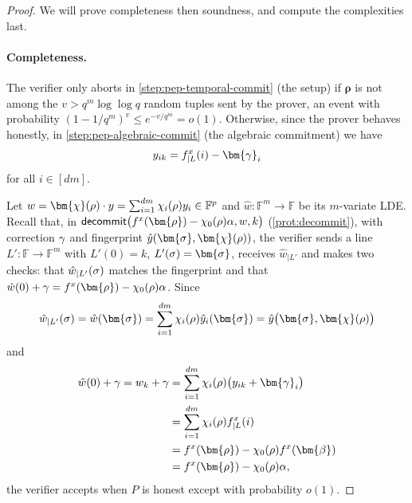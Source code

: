 \documentclass[a4paper,UKenglish,cleveref, autoref, thm-restate]{lipics-v2021}
\theoremstyle{definition}
\newcommand{\field}{\mathbb{F}}
\newcommand{\vcommitlength}{v}
\newcommand{\pcommitlength}{p}
\newcommand{\pcommitstring}{y}
\newcommand{\dimension}{m}
\newcommand{\degree}{d}
\newcommand{\fieldsize}{q}
\newcommand{\evaluationpoint}{\bm{\fe2}}
\newcommand{\fingerprinttuple}{\bm{\rho}}
\newcommand{\Fingerprinttuple}{\bm{\sigma}}
\renewcommand{\line}{L}
\def\fe#1{
    \ifnum#1=1
        \alpha
    \else
    \ifnum#1=2
        \beta
    \else
    \ifnum#1=3
        \gamma
    \fi\fi\fi
}
\def\rfe#1{
    \ifnum#1=1
        \rho
    \else
    \ifnum#1=2
        \sigma
    \else
    \fi\fi
}
\begin{document}
\begin{proof}
    We will prove completeness then soundness, and compute the complexities last.
    
    \paragraph*{Completeness\iflipics\else.\fi} The verifier only aborts in \cref{step:pep-temporal-commit} (the setup) if $\fingerprinttuple$ is not among the $\vcommitlength > \fieldsize^\dimension \log\log \fieldsize$ random tuples sent by the prover, an event with probability $(1 - 1/\fieldsize^\dimension)^\vcommitlength \leq e^{-\vcommitlength/\fieldsize^\dimension} = o(1)$. Otherwise, since the prover behaves honestly, in \cref{step:pep-algebraic-commit} (the algebraic commitment) we have
    \begin{equation*}
        \pcommitstring_{ik} = f^x_{| \line}(i) - \bm{\fe3}_i
    \end{equation*}
    for all $i \in [\degree \dimension]$.
    
    Let $w = \bm{\chi}(\rfe1) \cdot \pcommitstring = \sum_{i = 1}^{\degree\dimension} \chi_i(\rfe1) \pcommitstring_i \in \field^\pcommitlength$ and $\hat w: \field^\dimension \to \field$ be its $\dimension$-variate LDE. Recall that, in $\textsf{decommit}\big(f^x(\fingerprinttuple) - \chi_0(\rfe1) \fe1, w, k\big)$ (\cref{prot:decommit}), with correction $\fe3$ and fingerprint $\hat \pcommitstring(\Fingerprinttuple, \bm{\chi}(\rfe1))$, the verifier sends a line $\line': \field \to \field^\dimension$ with $\line'(0) = k$, $\line'(\rfe2) = \Fingerprinttuple$, receives $\hat w_{|\line'}$ and makes two checks: that $\hat w_{|\line'}(\rfe2)$ matches the fingerprint and that $\hat w(0) + \fe3 = f^x(\fingerprinttuple) - \chi_0(\rfe1) \fe1$. Since
    \begin{equation*}
        \hat w_{|\line'}(\rfe2) = \hat w(\Fingerprinttuple) = \sum_{i = 1}^{\degree\dimension} \chi_i(\rfe1) \hat \pcommitstring_i(\Fingerprinttuple) = \hat \pcommitstring\big(\Fingerprinttuple,  \bm{\chi}(\rfe1)\big)
    \end{equation*}
    and
    \begin{align*}
        \hat w(0) + \fe3 = w_k + \fe3 &= \sum_{i = 1}^{\degree \dimension} \chi_i(\rfe1) \big(\pcommitstring_{ik} + \bm{\fe3}_i\big)\\
        &= \sum_{i = 1}^{\degree \dimension} \chi_i(\rfe1) f^x_{|\line}(i)\\
        &= f^x(\fingerprinttuple) - \chi_0(\rfe1) f^x(\evaluationpoint)\\
        &= f^x(\fingerprinttuple) - \chi_0(\rfe1) \fe1,
    \end{align*}
    the verifier accepts when $P$ is honest except with probability $o(1)$.


\end{proof}
\end{document}
